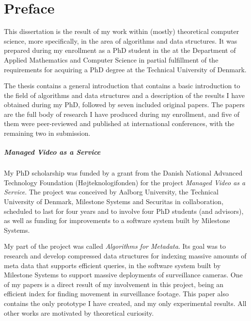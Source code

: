 \chapter{Preface}
This dissertation is the result of my work within (mostly) theoretical computer science, more specifically, in the area of algorithms and data structures. It was prepared during my enrollment as a PhD student in the  at the Department of Applied Mathematics and Computer Science in partial fulfillment of the requirements for acquiring a PhD degree at the Technical University of Denmark.


The thesis contains a general introduction that contains a basic introduction to the field of algorithms and data structures and a description of the results I have obtained during my PhD, followed by seven included original papers. The papers are the full body of research I have produced during my enrollment, and five of them were peer-reviewed and published at international conferences, with the remaining two in submission.


\paragraph{Managed Video as a Service}
My PhD scholarship was funded by a grant from the Danish National Advanced Technology Foundation (H{\o}jteknologifonden) for the project \emph{Managed Video as a Service}. The project was conceived by Aalborg University, the Technical University of Denmark, Milestone Systems and Securitas in collaboration, scheduled to last for four years and to involve four PhD students (and advisors), as well as funding for improvements to a software system built by Milestone Systems.

My part of the project was called \emph{Algorithms for Metadata}. Its goal was to research and develop compressed data structures for indexing massive amounts of meta data that supports efficient queries, in the software system built by Milestone Systems to support massive deployments of surveillance cameras. One of my papers is a direct result of my involvement in this project, being an efficient index for finding movement in surveillance footage. This paper also contains the only prototype I have created, and my only experimental results. All other works are motivated by theoretical curiosity.

